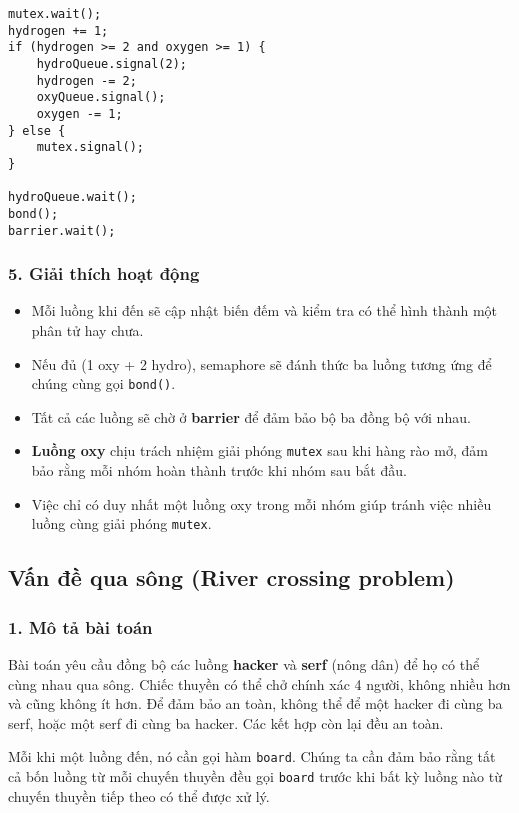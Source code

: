 \begin{lstlisting}
mutex.wait();
hydrogen += 1;
if (hydrogen >= 2 and oxygen >= 1) {
    hydroQueue.signal(2);
    hydrogen -= 2;
    oxyQueue.signal();
    oxygen -= 1;
} else {
    mutex.signal();
}

hydroQueue.wait();
bond();
barrier.wait();
\end{lstlisting}

\subsubsection*{5. Giải thích hoạt động}

\begin{itemize}
  \item Mỗi luồng khi đến sẽ cập nhật biến đếm và kiểm tra có thể hình thành một phân tử hay chưa.
  \item Nếu đủ (1 oxy + 2 hydro), semaphore sẽ đánh thức ba luồng tương ứng để chúng cùng gọi \texttt{bond()}.
  \item Tất cả các luồng sẽ chờ ở \textbf{barrier} để đảm bảo bộ ba đồng bộ với nhau.
  \item \textbf{Luồng oxy} chịu trách nhiệm giải phóng \texttt{mutex} sau khi hàng rào mở, đảm bảo rằng mỗi nhóm hoàn thành trước khi nhóm sau bắt đầu.
  \item Việc chỉ có duy nhất một luồng oxy trong mỗi nhóm giúp tránh việc nhiều luồng cùng giải phóng \texttt{mutex}.
\end{itemize}
\newpage
\subsection{Vấn đề qua sông (River crossing problem)}

\subsubsection*{1. Mô tả bài toán}

Bài toán yêu cầu đồng bộ các luồng \textbf{hacker} và \textbf{serf} (nông dân) để họ có thể cùng nhau qua sông. Chiếc thuyền có thể chở chính xác 4 người, không nhiều hơn và cũng không ít hơn. Để đảm bảo an toàn, không thể để một hacker đi cùng ba serf, hoặc một serf đi cùng ba hacker. Các kết hợp còn lại đều an toàn.

Mỗi khi một luồng đến, nó cần gọi hàm \texttt{board}. Chúng ta cần đảm bảo rằng tất cả bốn luồng từ mỗi chuyến thuyền đều gọi \texttt{board} trước khi bất kỳ luồng nào từ chuyến thuyền tiếp theo có thể được xử lý.

